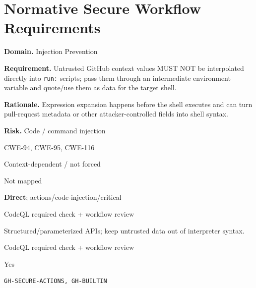 \documentclass[10pt,letterpaper]{article}
\newcommand{\code}[1]{\texttt{\small #1}}
\newcommand{\prioritybadge}[2]{\tcbox[on line,boxrule=0pt,arc=1.2mm,boxsep=0.7mm,left=1mm,right=1mm,top=0.4mm,bottom=0.4mm,colback=#2!12,coltext=#2]{\scriptsize\bfseries #1}}
\begin{document}
\section{Normative Secure Workflow Requirements}
\begin{rulebox}[title={\texttt{SCS-ACTIONS-INJ-001} \hfill \prioritybadge{Critical Control}{Critical}}]
\textbf{Domain.} Injection Prevention

\textbf{Requirement.} Untrusted GitHub context values MUST NOT be interpolated directly into \code{run:} scripts; pass them through an intermediate environment variable and quote/use them as data for the target shell.

\textbf{Rationale.} Expression expansion happens before the shell executes and can turn pull-request metadata or other attacker-controlled fields into shell syntax.

\textbf{Risk.} Code / command injection

\begin{description}[leftmargin=2.65cm,labelwidth=2.3cm,style=nextline,itemsep=1pt,topsep=3pt]
  \item[CWE] CWE-94, CWE-95, CWE-116
  \item[OWASP] Context-dependent / not forced
  \item[CERT] Not mapped
  \item[CodeQL] \textbf{Direct}; actions/code-injection/critical
  \item[Enforcement] CodeQL required check + workflow review
  \item[Prevention] Structured/parameterized APIs; keep untrusted data out of interpreter syntax.
  \item[Verification] CodeQL required check + workflow review
  \item[Automation] Yes
  \item[Sources] \texttt{GH-SECURE-ACTIONS, GH-BUILTIN}
\end{description}
\end{rulebox}
\end{document}
